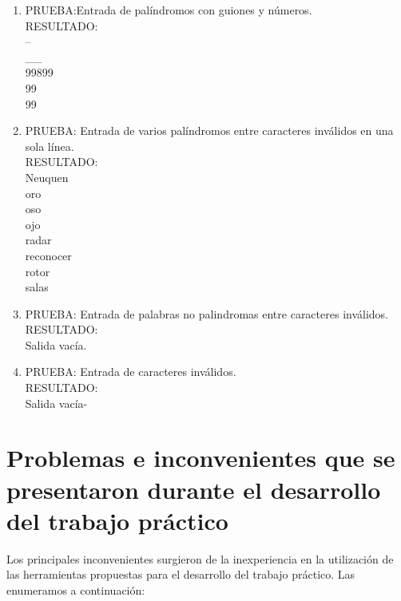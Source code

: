 \documentclass[a4paper,10pt]{article}
\begin{document}
\begin{enumerate}[1.]
	\item PRUEBA:Entrada de pal\'indromos con guiones y n\'umeros.\\
	RESULTADO:\\
	--\\
	\_\_\\
	99899\\
	99\\
	99\\

	\item PRUEBA: Entrada de varios pal\'indromos entre caracteres inv\'alidos en una sola l\'inea.\\
	RESULTADO:\\
	Neuquen\\
	oro\\
	oso\\
	ojo\\
	radar\\
	reconocer\\
	rotor\\
	salas\\

	\item PRUEBA: Entrada de palabras no palindromas entre caracteres inv\'alidos.\\
	RESULTADO:\\
	Salida vac\'ia.\\

	\item PRUEBA: Entrada de caracteres inv\'alidos.\\
	RESULTADO:\\
	Salida vac\'ia-\\
\end{enumerate}

\section{Problemas e inconvenientes que se presentaron durante el desarrollo del trabajo pr\'actico}
Los principales inconvenientes surgieron de la inexperiencia en la utilizaci\'on de las herramientas propuestas para el desarrollo del trabajo pr\'actico. Las enumeramos a continuaci\'on:
\end{document}
